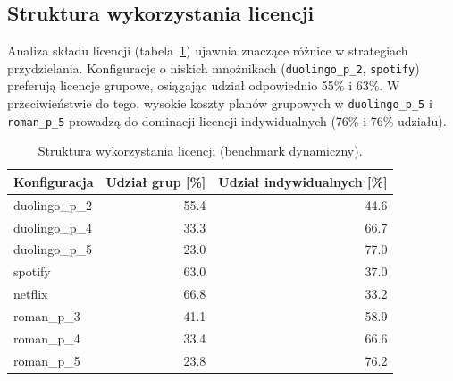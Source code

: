 \subsection{Struktura wykorzystania licencji}

Analiza składu licencji (tabela~\ref{tab:ext-dynamic-license-mix}) ujawnia znaczące różnice w strategiach przydzielania. Konfiguracje o niskich mnożnikach (\texttt{duolingo\_p\_2}, \texttt{spotify}) preferują licencje grupowe, osiągając udział odpowiednio 55\% i 63\%. W przeciwieństwie do tego, wysokie koszty planów grupowych w \texttt{duolingo\_p\_5} i \texttt{roman\_p\_5} prowadzą do dominacji licencji indywidualnych (76\% i 76\% udziału).

\begin{table}[H]
  \centering
  \caption{Struktura wykorzystania licencji (benchmark dynamiczny).}
  \label{tab:ext-dynamic-license-mix}
  \begin{tabular}{lrr}
    \toprule
    \textbf{Konfiguracja} & \textbf{Udział grup [\%]} & \textbf{Udział indywidualnych [\%]} \\
    \midrule
    duolingo\_p\_2        & 55.4                      & 44.6                                \\
    duolingo\_p\_4        & 33.3                      & 66.7                                \\
    duolingo\_p\_5        & 23.0                      & 77.0                                \\
    spotify               & 63.0                      & 37.0                                \\
    netflix               & 66.8                      & 33.2                                \\
    roman\_p\_3           & 41.1                      & 58.9                                \\
    roman\_p\_4           & 33.4                      & 66.6                                \\
    roman\_p\_5           & 23.8                      & 76.2                                \\
    \bottomrule
  \end{tabular}
\end{table}

